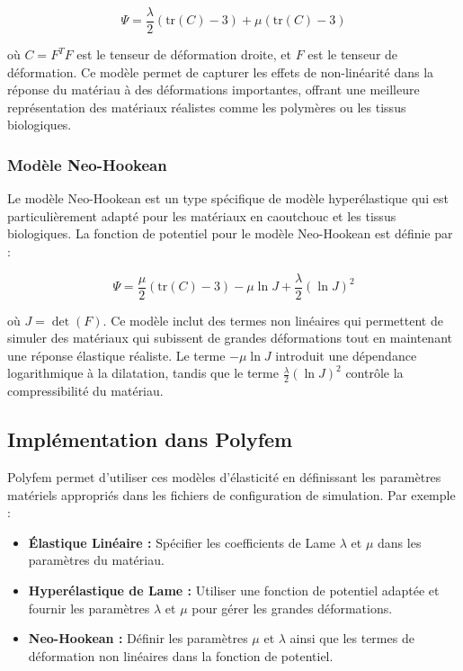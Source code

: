 \[
\Psi = \frac{\lambda}{2} \left( \text{tr}(C) - 3 \right) + \mu \left( \text{tr}(C) - 3 \right)
\]

où \( C = F^T F \) est le tenseur de déformation droite, et \( F \) est le tenseur de déformation. Ce modèle permet de capturer les effets de non-linéarité dans la réponse du matériau à des déformations importantes, offrant une meilleure représentation des matériaux réalistes comme les polymères ou les tissus biologiques.

\subsubsection{Modèle Neo-Hookean}

Le modèle Neo-Hookean est un type spécifique de modèle hyperélastique qui est particulièrement adapté pour les matériaux en caoutchouc et les tissus biologiques. La fonction de potentiel pour le modèle Neo-Hookean est définie par :

\[
\Psi = \frac{\mu}{2} \left( \text{tr}(C) - 3 \right) - \mu \ln J + \frac{\lambda}{2} (\ln J)^2
\]

où \( J = \det(F) \). Ce modèle inclut des termes non linéaires qui permettent de simuler des matériaux qui subissent de grandes déformations tout en maintenant une réponse élastique réaliste. Le terme \( -\mu \ln J \) introduit une dépendance logarithmique à la dilatation, tandis que le terme \( \frac{\lambda}{2} (\ln J)^2 \) contrôle la compressibilité du matériau.

\subsection{Implémentation dans Polyfem}

Polyfem permet d'utiliser ces modèles d'élasticité en définissant les paramètres matériels appropriés dans les fichiers de configuration de simulation. Par exemple :

\begin{itemize}
    \item \textbf{Élastique Linéaire :} Spécifier les coefficients de Lame \( \lambda \) et \( \mu \) dans les paramètres du matériau.
    \item \textbf{Hyperélastique de Lame :} Utiliser une fonction de potentiel adaptée et fournir les paramètres \( \lambda \) et \( \mu \) pour gérer les grandes déformations.
    \item \textbf{Neo-Hookean :} Définir les paramètres \( \mu \) et \( \lambda \) ainsi que les termes de déformation non linéaires dans la fonction de potentiel.
\end{itemize}

